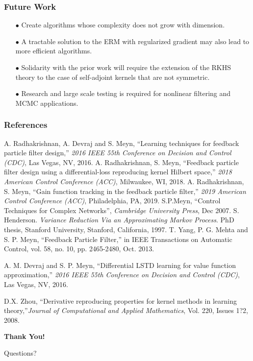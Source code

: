 \documentclass[xcolor=dvipsnames, subsection=false]{beamer}
\def\alertb#1{\alert{\color{BrickRed}  #1}}
\def\alertb#1{\alert{\color{BrickRed}  #1}}
\begin{document}
\begin{frame}
\frametitle{Future Work}
\begin{itemize}
	\item[$\bullet$]
	Create algorithms whose complexity does not grow with dimension.
	\item[$\bullet$]
	A tractable solution to the ERM with regularized gradient may also lead to more efficient algorithms.
	
	\item[$\bullet$] Solidarity with the prior work  will require the extension of the RKHS theory to the case of self-adjoint kernels that are not symmetric.
	
	\item[$\bullet$]
	Research and large scale testing is required for nonlinear filtering and MCMC applications.
	
\end{itemize}
\end{frame}

\begin{frame}
\frametitle{References}

\begin{thebibliography}{10}
	\tiny
	A. Radhakrishnan, A. Devraj and S. Meyn, ``Learning techniques for feedback particle filter design,'' \textit{ 2016 IEEE 55th Conference on Decision and Control (CDC)}, Las Vegas, NV, 2016.
	A. Radhakrishnan, S. Meyn, ``Feedback particle filter design using a differential-loss reproducing kernel Hilbert space,'' \textit{2018 American Control Conference (ACC)}, Milwaukee, WI, 2018.
	A. Radhakrishnan, S. Meyn, ``Gain function tracking in the feedback particle filter,'' \textit{2019 American Control Conference (ACC)}, Philadelphia, PA, 2019.
	S.P.Meyn, ``Control Techniques for Complex Networks'', \textit{Cambridge University Press}, Dec 2007.
	S. Henderson. \textit{Variance Reduction Via an Approximating Markov Process}. PhD thesis, Stanford University, Stanford, California, 1997.
	T. Yang, P. G. Mehta and S. P. Meyn, ``Feedback Particle Filter,'' in IEEE Transactions on Automatic Control, vol. 58, no. 10, pp. 2465-2480, Oct. 2013.
	
	A. M. Devraj and S. P. Meyn, ``Differential LSTD learning for value function approximation,'' \textit{2016 IEEE 55th Conference on Decision and Control (CDC)}, Las Vegas, NV, 2016.
	
	D.X. Zhou,
``Derivative reproducing properties for kernel methods in learning theory,''\textit{Journal of Computational and Applied Mathematics},
 Vol. 220, Issues 1?2,
	2008.
	
\end{thebibliography}
\end{frame}



\begin{frame}
\centerline{\bf \huge \color{OrangeRed} Thank You!}
\vfill
\centerline{\huge \alertb{Questions?}}
\vfill
\end{frame}
\end{document}
